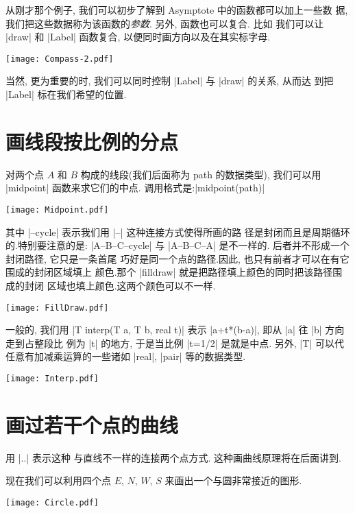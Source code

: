 \documentclass{ctexbook}
\begin{document}
从刚才那个例子, 我们可以初步了解到 Asymptote 中的函数都可以加上一些数
据, 我们把这些数据称为该函数的\emph{参数}. 另外, 函数也可以复合. 比如
我们可以让 |draw| 和 |Label| 函数复合, 以便同时画方向以及在其实标字母.

\begin{center}\texttt{[image: Compass-2.pdf]}\end{center}%


当然, 更为重要的时, 我们可以同时控制 |Label| 与 |draw| 的关系, 从而达
到把 |Label| 标在我们希望的位置.

\section{画线段按比例的分点}
对两个点 $A$ 和 $B$ 构成的线段(我们后面称为 {path} 的数据类型),
我们可以用 |midpoint| 函数来求它们的中点.
调用格式是:|midpoint(path)|

\begin{center}\texttt{[image: Midpoint.pdf]}\end{center}%


其中 |--cycle| 表示我们用 |--| 这种连接方式使得所画的路
径是封闭而且是周期循环的.特别要注意的是: |A--B--C--cycle| 与
|A--B--C--A| 是不一样的. 后者并不形成一个封闭路径, 它只是一条首尾
巧好是同一个点的路径.因此, 也只有前者才可以在有它围成的封闭区域填上
颜色.那个 |filldraw| 就是把路径填上颜色的同时把该路径围成的封闭
区域也填上颜色.这两个颜色可以不一样.
\begin{center}\texttt{[image: FillDraw.pdf]}\end{center}%


一般的, 我们用 |T interp(T a, T b, real t)| 表示
|a+t*(b-a)|, 即从 |a| 往 |b| 方向走到占整段比
例为 |t| 的地方, 于是当比例 |t=1/2| 是就是中点. 另外,
|T| 可以代任意有加减乘运算的一些诸如 |real|,
|pair| 等的数据类型. 
\begin{center}\texttt{[image: Interp.pdf]}\end{center}%


\section{画过若干个点的曲线}
用 |..| 表示这种
与直线不一样的连接两个点方式. 这种画曲线原理将在后面讲到. 

现在我们可以利用四个点 $E$, $N$, $W$, $S$ 来画出一个与圆非常接近的图形.
\begin{center}\texttt{[image: Circle.pdf]}\end{center}%

\end{document}

